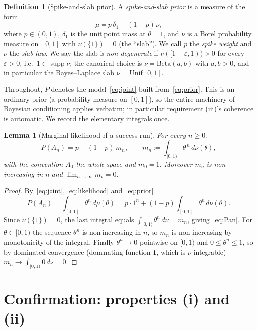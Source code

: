 \documentclass{amsart}
\newtheorem{lemma}{Lemma}
\theoremstyle{definition}
\newtheorem{definition}{Definition}
\newcommand{\one}{\mathbf{1}}
\begin{document}
\begin{definition}[Spike-and-slab prior]\label{def:spikeslab}
A \emph{spike-and-slab prior} is a measure of the form
\begin{equation}\label{eq:prior}
  \mu = p\,\delta_{1} + (1-p)\,\nu,
\end{equation}
where $p\in(0,1)$, $\delta_1$ is the unit point mass at $\theta=1$, and $\nu$ is
a Borel probability measure on $[0,1]$ with $\nu(\{1\})=0$ (the ``slab'').
We call $p$ the \emph{spike weight} and $\nu$ the \emph{slab law}. We say the
slab is \emph{non-degenerate} if $\nu([1-\varepsilon,1))>0$ for every
$\varepsilon>0$, i.e.\ $1\in\operatorname{supp}\nu$; the canonical choice is
$\nu=\mathrm{Beta}(a,b)$ with $a,b>0$, and in particular the
Bayes--Laplace slab $\nu=\mathrm{Unif}[0,1]$.
\end{definition}

Throughout, $P$ denotes the model~\eqref{eq:joint} built from~\eqref{eq:prior}.
This is an ordinary prior (a probability measure on $[0,1]$), so the entire
machinery of Bayesian conditioning applies verbatim; in particular requirement
(iii)'s coherence is automatic. We record the elementary integrals once.

\begin{lemma}[Marginal likelihood of a success run]\label{lem:marginal}
For every $n\ge0$,
\begin{equation}\label{eq:Pan}
  P(A_n)=p+(1-p)\,m_n,\qquad m_n:=\int_{[0,1)}\theta^{\,n}\,d\nu(\theta),
\end{equation}
with the convention $A_0$ the whole space and $m_0=1$. Moreover $m_n$ is
non-increasing in $n$ and $\lim_{n\to\infty}m_n=0$.
\end{lemma}

\begin{proof}
By~\eqref{eq:joint}, \eqref{eq:likelihood} and~\eqref{eq:prior},
\[
  P(A_n)=\int_{[0,1]}\theta^n\,d\mu(\theta)
  =p\cdot 1^n+(1-p)\int_{[0,1]}\theta^n\,d\nu(\theta).
\]
Since $\nu(\{1\})=0$, the last integral equals $\int_{[0,1)}\theta^n\,d\nu=m_n$,
giving~\eqref{eq:Pan}. For $\theta\in[0,1)$ the sequence $\theta^n$ is
non-increasing in $n$, so $m_n$ is non-increasing by monotonicity of the
integral. Finally $\theta^n\to 0$ pointwise on $[0,1)$ and $0\le\theta^n\le1$,
so by dominated convergence (dominating function $\one$, which is
$\nu$-integrable) $m_n\to\int_{[0,1)}0\,d\nu=0$.
\end{proof}

\section{Confirmation: properties (i) and (ii)}\label{sec:confirm}
\end{document}

